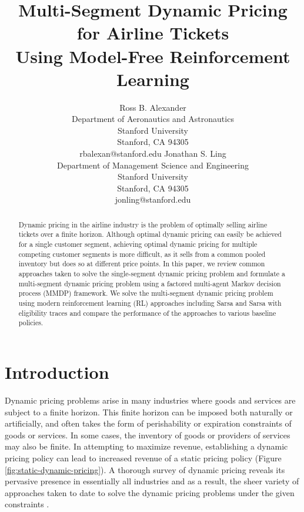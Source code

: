 \documentclass[letterpaper]{article}%
\title{Multi-Segment Dynamic Pricing for Airline Tickets \\ Using Model-Free Reinforcement Learning}
\author{Ross B. Alexander \\ Department of Aeronautics and Astronautics \\ Stanford University \\ Stanford, CA 94305 \\ rbalexan@stanford.edu
\And Jonathan S. Ling \\ Department of Management Science and Engineering \\ Stanford University \\ Stanford, CA 94305 \\ jonling@stanford.edu}
\begin{document}
\maketitle

\begin{abstract}
    Dynamic pricing in the airline industry is the problem of optimally selling airline tickets over a finite horizon. Although optimal dynamic pricing can easily be achieved for a single customer segment, achieving optimal dynamic pricing for multiple competing customer segments is more difficult, as it sells from a common pooled inventory but does so at different price points. In this paper, we review common approaches taken to solve the single-segment dynamic pricing problem and formulate a multi-segment dynamic pricing problem using a factored multi-agent Markov decision process (MMDP) framework. We solve the multi-segment dynamic pricing problem using modern reinforcement learning (RL) approaches including Sarsa and Sarsa with eligibility traces and compare the performance of the approaches to various baseline policies.
\end{abstract}

\section{Introduction}

Dynamic pricing problems arise in many industries where goods and services are subject to a finite horizon. This finite horizon can be imposed both naturally or artificially, and often takes the form of perishability or expiration constraints of goods or services. In some cases, the inventory of goods or providers of services may also be finite. In attempting to maximize revenue, establishing a dynamic pricing policy can lead to increased revenue of a static pricing policy (Figure \ref{fig:static-dynamic-pricing}). A thorough survey of dynamic pricing reveals its pervasive presence in essentially all industries and as a result, the sheer variety of approaches taken to date to solve the dynamic pricing problems under the given constraints \cite{denBoer2015DynamicDirections}.
\end{document}
